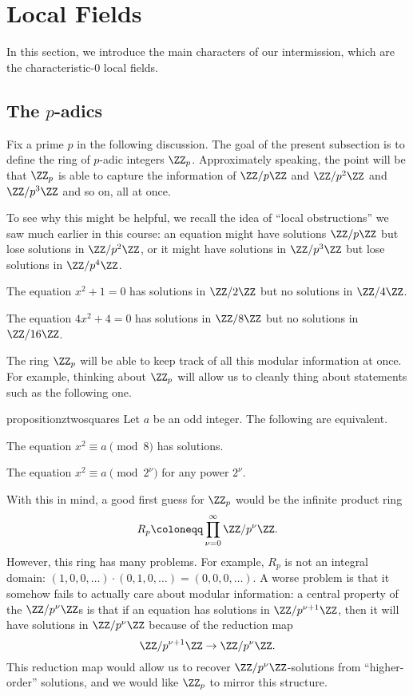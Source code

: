 \documentclass[../notes.tex]{subfiles}
\begin{document}
\section{Local Fields}

In this section, we introduce the main characters of our intermission, which are the characteristic-$0$ local fields.

\subsection{The \texorpdfstring{$p$}{ p}-adics}
Fix a prime $p$ in the following discussion. The goal of the present subsection is to define the ring of $p$-adic integers $\ZZ_p$. Approximately speaking, the point will be that $\ZZ_p$ is able to capture the information of $\ZZ/p\ZZ$ and $\ZZ/p^2\ZZ$ and $\ZZ/p^3\ZZ$ and so on, all at once.

To see why this might be helpful, we recall the idea of ``local obstructions'' we saw much earlier in this course: an equation might have solutions $\ZZ/p\ZZ$ but lose solutions in $\ZZ/p^2\ZZ$, or it might have solutions in $\ZZ/p^3\ZZ$ but lose solutions in $\ZZ/p^4\ZZ$.
\begin{example}
	The equation $x^2+1=0$ has solutions in $\ZZ/2\ZZ$ but no solutions in $\ZZ/4\ZZ$.
\end{example}
\begin{example}
	The equation $4x^2+4=0$ has solutions in $\ZZ/8\ZZ$ but no solutions in $\ZZ/16\ZZ$.
\end{example}
The ring $\ZZ_p$ will be able to keep track of all this modular information at once. For example, thinking about $\ZZ_p$ will allow us to cleanly thing about statements such as the following one.
\begin{restatable}{proposition}{ztwosquares} \label{prop:squares-z2}
	Let $a$ be an odd integer. The following are equivalent.
	\begin{listalph}
		\item The equation $x^2\equiv a\pmod 8$ has solutions.
		\item The equation $x^2\equiv a\pmod{2^\nu}$ for any power $2^\nu$.
	\end{listalph}
\end{restatable}
\noindent With this in mind, a good first guess for $\ZZ_p$ would be the infinite product ring
\[R_p\coloneqq\prod_{\nu=0}^\infty\ZZ/p^\nu\ZZ.\]
However, this ring has many problems. For example, $R_p$ is not an integral domain: $(1,0,0,\ldots)\cdot(0,1,0,\ldots)=(0,0,0,\ldots)$. A worse problem is that it somehow fails to actually care about modular information: a central property of the $\ZZ/p^\nu\ZZ$s is that if an equation has solutions in $\ZZ/p^{\nu+1}\ZZ$, then it will have solutions in $\ZZ/p^\nu\ZZ$ because of the reduction map
\begin{equation}
	\ZZ/p^{\nu+1}\ZZ\to\ZZ/p^\nu\ZZ. \label{eq:zpz-proj}
\end{equation}
This reduction map would allow us to recover $\ZZ/p^\nu\ZZ$-solutions from ``higher-order'' solutions, and we would like $\ZZ_p$ to mirror this structure.
\end{document}
